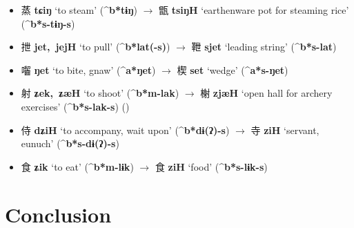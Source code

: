 \documentclass[oneside,a4paper,11pt]{article}
\newcommand{\ipa}[1]{\textbf{{\phon\mbox{#1}}}} %
\newcommand{\zh}[1]{{\cn #1}}
\newcommand{\zhc}[2]{\zh{#1} \ipa{#2}}
\begin{document}
\begin{itemize}
\item \zhc{蒸}{tɕiŋ} `to steam' (\ipa{^b*tɨŋ}) $\rightarrow$ \zhc{甑}{tsiŋH} `earthenware pot for steaming rice' (\ipa{^b*s-tɨŋ-s})
\item \zhc{抴}{jet, jejH} `to pull' (\ipa{^b*lat(-s)}) $\rightarrow$ \zhc{靾}{sjet} `leading string' (\ipa{^b*s-lat})
\item \zhc{囓}{ŋet} `to bite, gnaw' (\ipa{^a*ŋet}) $\rightarrow$ \zhc{楔}{set} `wedge' (\ipa{^a*s-ŋet})
\item \zhc{射}{ʑek, ʑæH} `to shoot' (\ipa{^b*m-lak}) $\rightarrow$ \zhc{榭}{zjæH} `open hall for archery exercises' (\ipa{^b*s-lak-s}) (\citealt{jacques18antipass})
\item \zhc{侍}{dʑiH} `to accompany, wait upon' (\ipa{^b*dɨ(ʔ)-s}) $\rightarrow$ \zhc{寺}{ziH} `servant, eunuch' (\ipa{^b*s-dɨ(ʔ)-s})
\item \zhc{食}{ʑik} `to eat' (\ipa{^b*m-lɨk}) $\rightarrow$ \zhc{食}{ziH} `food' (\ipa{^b*s-lɨk-s})
\end{itemize}

\section{Conclusion}



\end{document}
